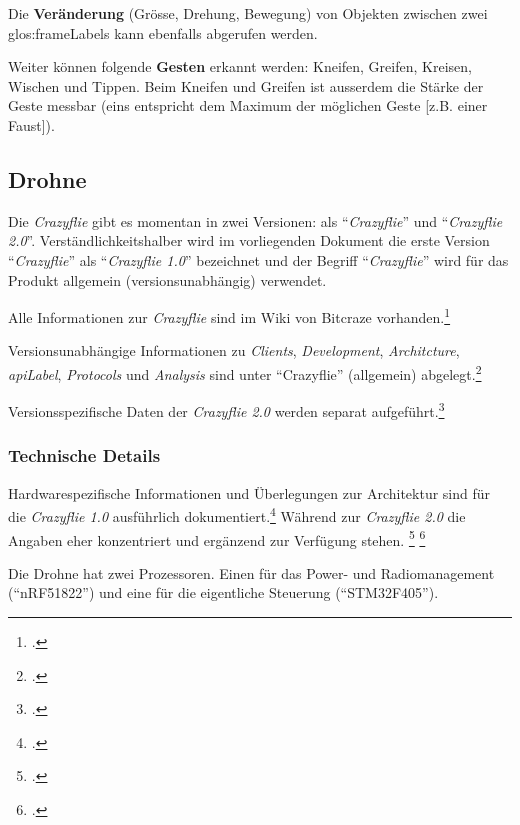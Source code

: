Die \textbf{Veränderung} (Grösse, Drehung, Bewegung) von Objekten zwischen zwei \glspl{glos:frameLabel} kann ebenfalls abgerufen werden.

Weiter können folgende \textbf{Gesten} erkannt werden: Kneifen, Greifen, Kreisen, Wischen und Tippen.
Beim Kneifen und Greifen ist ausserdem die Stärke der Geste messbar (eins entspricht dem Maximum der möglichen Geste [z.B. einer Faust]).

\subsection{Drohne}
\label{subsec:isAnalyseDrone}
Die \textit{Crazyflie} gibt es momentan in zwei Versionen: als "`\textit{Crazyflie}"' und "`\textit{Crazyflie 2.0}"'. Verständlichkeitshalber wird im vorliegenden Dokument die erste Version "`\textit{Crazyflie}"' als "`\textit{Crazyflie 1.0}"' bezeichnet und der Begriff "`\textit{Crazyflie}"' wird für das Produkt allgemein (versionsunabhängig) verwendet.

Alle Informationen zur \textit{Crazyflie} sind im Wiki von Bitcraze vorhanden.\footcite{index_Bitcraze_Wiki_2015-03-29}

Versionsunabhängige Informationen zu  \textit{Clients}, \textit{Development}, \textit{Architcture}, \textit{\gls{apiLabel}}, \textit{Protocols} und \textit{Analysis} sind unter "`Crazyflie"' (allgemein) abgelegt.\footcite{doc_crazyflie_index_Bitcraze_Wiki_2015-03-29}

Versionsspezifische Daten der \textit{Crazyflie 2.0} werden separat aufgeführt.\footcite{projects_crazyflie2_index_Bitcraze_Wiki_2015-03-29}

\subsubsection{Technische Details}
Hardwarespezifische Informationen und Überlegungen zur Architektur sind für die \textit{Crazyflie 1.0} ausführlich dokumentiert.\footcite{projects_crazyflie_hardware_explained_Bitcraze_Wiki_2015-03-29}
Während zur \textit{Crazyflie 2.0} die Angaben eher konzentriert und ergänzend zur Verfügung stehen.
\footcite{projects_crazyflie2_architecture_index_Bitcraze_Wiki_2015-03-29}
\footcite{projects_crazyflie2_hardware_specification_Bitcraze_Wiki_2015-03-29}

Die Drohne hat zwei Prozessoren. Einen für das Power- und Radiomanagement ("`nRF51822"') und eine für die eigentliche Steuerung ("`STM32F405"').

